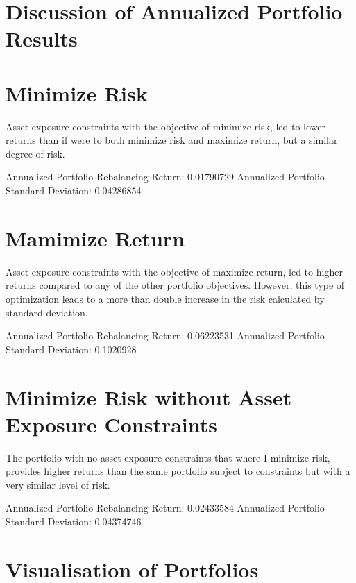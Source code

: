 \documentclass[
]{article}
\begin{document}
\hypertarget{discussion-of-annualized-portfolio-results}{%
\section{Discussion of Annualized Portfolio
Results}\label{discussion-of-annualized-portfolio-results}}

\hypertarget{minimize-risk-1}{%
\section{Minimize Risk}\label{minimize-risk-1}}

Asset exposure constraints with the objective of minimize risk, led to
lower returns than if were to both minimize risk and maximize return,
but a similar degree of risk.

Annualized Portfolio Rebalancing Return: 0.01790729 Annualized Portfolio
Standard Deviation: 0.04286854

\hypertarget{mamimize-return}{%
\section{Mamimize Return}\label{mamimize-return}}

Asset exposure constraints with the objective of maximize return, led to
higher returns compared to any of the other portfolio objectives.
However, this type of optimization leads to a more than double increase
in the risk calculated by standard deviation.

Annualized Portfolio Rebalancing Return: 0.06223531 Annualized Portfolio
Standard Deviation: 0.1020928

\hypertarget{minimize-risk-without-asset-exposure-constraints-1}{%
\section{Minimize Risk without Asset Exposure
Constraints}\label{minimize-risk-without-asset-exposure-constraints-1}}

The portfolio with no asset exposure constraints that where I minimize
risk, provides higher returns than the same portfolio subject to
constraints but with a very similar level of risk.

Annualized Portfolio Rebalancing Return: 0.02433584 Annualized Portfolio
Standard Deviation: 0.04374746

\hypertarget{visualisation-of-portfolios}{%
\section{Visualisation of
Portfolios}\label{visualisation-of-portfolios}}
\end{document}
